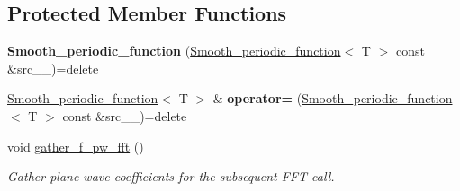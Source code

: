 \subsection*{Protected Member Functions}
\begin{DoxyCompactItemize}
\item 
\hypertarget{classsirius_1_1experimental_1_1_smooth__periodic__function_aef72b77a22963da4ea4951e48f526805}{}{\bfseries Smooth\+\_\+periodic\+\_\+function} (\hyperlink{classsirius_1_1experimental_1_1_smooth__periodic__function}{Smooth\+\_\+periodic\+\_\+function}$<$ T $>$ const \&src\+\_\+\+\_\+)=delete\label{classsirius_1_1experimental_1_1_smooth__periodic__function_aef72b77a22963da4ea4951e48f526805}

\item 
\hypertarget{classsirius_1_1experimental_1_1_smooth__periodic__function_ac2f6b8639dc1b25d709aea3c51080888}{}\hyperlink{classsirius_1_1experimental_1_1_smooth__periodic__function}{Smooth\+\_\+periodic\+\_\+function}$<$ T $>$ \& {\bfseries operator=} (\hyperlink{classsirius_1_1experimental_1_1_smooth__periodic__function}{Smooth\+\_\+periodic\+\_\+function}$<$ T $>$ const \&src\+\_\+\+\_\+)=delete\label{classsirius_1_1experimental_1_1_smooth__periodic__function_ac2f6b8639dc1b25d709aea3c51080888}

\item 
void \hyperlink{classsirius_1_1experimental_1_1_smooth__periodic__function_a1d0c1a498109707a699b34d5db959138}{gather\+\_\+f\+\_\+pw\+\_\+fft} ()
\begin{DoxyCompactList}\small\item\em Gather plane-\/wave coefficients for the subsequent F\+F\+T call. \end{DoxyCompactList}\end{DoxyCompactItemize}
